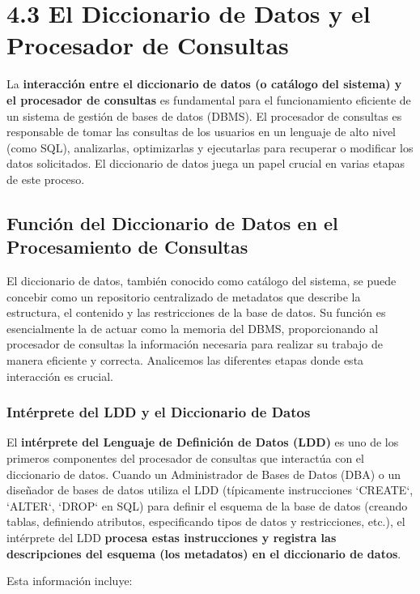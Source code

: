 \section{4.3 El Diccionario de Datos y el Procesador de Consultas}

La \textbf{interacción entre el diccionario de datos (o catálogo del sistema) y el procesador de consultas} es fundamental para el funcionamiento eficiente de un sistema de gestión de bases de datos (DBMS). El procesador de consultas es responsable de tomar las consultas de los usuarios en un lenguaje de alto nivel (como SQL), analizarlas, optimizarlas y ejecutarlas para recuperar o modificar los datos solicitados. El diccionario de datos juega un papel crucial en varias etapas de este proceso.

\subsection{Función del Diccionario de Datos en el Procesamiento de Consultas}

El diccionario de datos, también conocido como catálogo del sistema, se puede concebir como un repositorio centralizado de metadatos que describe la estructura, el contenido y las restricciones de la base de datos.  Su función es esencialmente la de actuar como la memoria del DBMS, proporcionando al procesador de consultas la información necesaria para realizar su trabajo de manera eficiente y correcta. Analicemos las diferentes etapas donde esta interacción es crucial.

\subsubsection{Intérprete del LDD y el Diccionario de Datos}

El \textbf{intérprete del Lenguaje de Definición de Datos (LDD)} es uno de los primeros componentes del procesador de consultas que interactúa con el diccionario de datos. Cuando un Administrador de Bases de Datos (DBA) o un diseñador de bases de datos utiliza el LDD (típicamente instrucciones `CREATE`, `ALTER`, `DROP` en SQL) para definir el esquema de la base de datos (creando tablas, definiendo atributos, especificando tipos de datos y restricciones, etc.), el intérprete del LDD \textbf{procesa estas instrucciones y registra las descripciones del esquema (los metadatos) en el diccionario de datos}.

Esta información incluye:

